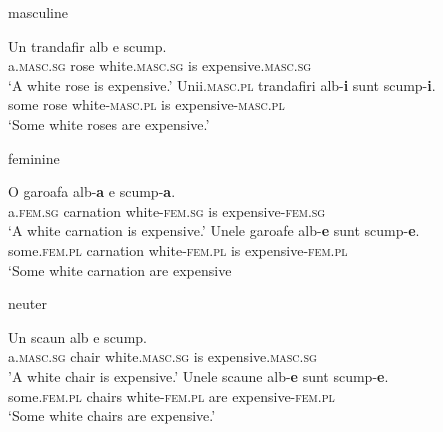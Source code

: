 \begin{exe}
    \ex \label{romanian-masc-exe} masculine
    \begin{xlist}
        \ex 
        \gll Un trandafir alb e scump.\\
        a.\textsc{masc.sg} rose white.\textsc{masc.sg} is expensive.\textsc{masc.sg}\\
        \glt `A white rose is expensive.'
        \ex 
        \gll Unii.\textsc{masc.pl} trandafiri alb-\textbf{i} sunt scump-\textbf{i}.\\
        some rose white-\textsc{masc.pl} is expensive-\textsc{masc.pl}\\
        \glt `Some white roses are expensive.'
    \end{xlist}
    
    \ex feminine
    \begin{xlist}
        \ex 
        \gll O garoafa alb-\textbf{a} e scump-\textbf{a}.\\
        a.\textsc{fem.sg} carnation white-\textsc{fem.sg} is expensive-\textsc{fem.sg}\\
        \glt `A white carnation is expensive.'
        \ex 
        \gll Unele garoafe alb-\textbf{e} sunt scump-\textbf{e}.\\
        some.\textsc{fem.pl} carnation white-\textsc{fem.pl} is expensive-\textsc{fem.pl}\\
        \glt `Some white carnation are expensive
    \end{xlist}

    \ex \label{romanian-neut-exe} neuter
    \begin{xlist}
        \ex 
        \gll Un scaun alb e scump.\\
        a.\textsc{masc.sg} chair white.\textsc{masc.sg} is expensive.\textsc{masc.sg}\\
        \glt 'A white chair is expensive.'
        \ex 
        \gll Unele scaune alb-\textbf{e} sunt scump-\textbf{e}.\\
        some.\textsc{fem.pl} chairs white-\textsc{fem.pl} are expensive-\textsc{fem.pl}\\
        \glt `Some white chairs are expensive.'
    \end{xlist}
\end{exe}

